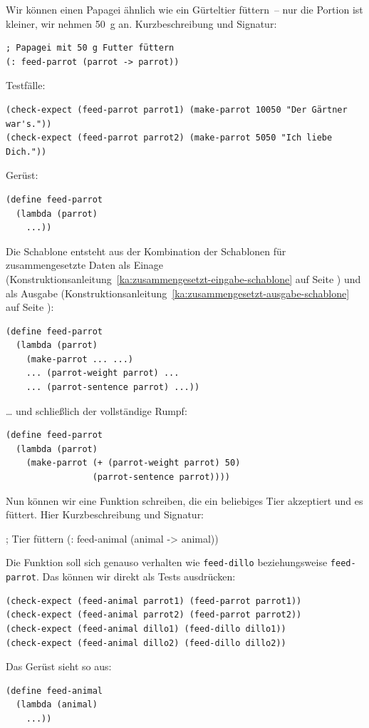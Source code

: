 Wir können einen Papagei ähnlich wie ein Gürteltier füttern~-- nur die
Portion ist kleiner, wir nehmen 50~g an.  Kurzbeschreibung und Signatur:
%
\begin{lstlisting}
; Papagei mit 50 g Futter füttern
(: feed-parrot (parrot -> parrot))
\end{lstlisting}
%
Testfälle:
%
\begin{lstlisting}
(check-expect (feed-parrot parrot1) (make-parrot 10050 "Der Gärtner war's."))
(check-expect (feed-parrot parrot2) (make-parrot 5050 "Ich liebe Dich."))
\end{lstlisting}
%
Gerüst:
%
\begin{lstlisting}
(define feed-parrot
  (lambda (parrot)
    ...))
\end{lstlisting}
%
Die Schablone entsteht aus der Kombination der Schablonen für
zusammengesetzte Daten
als Einage (Konstruktionsanleitung~\ref{ka:zusammengesetzt-eingabe-schablone} auf
Seite \pageref{ka:zusammengesetzt-eingabe-schablone}) und als Ausgabe
(Konstruktionsanleitung~\ref{ka:zusammengesetzt-ausgabe-schablone} auf
Seite \pageref{ka:zusammengesetzt-ausgabe-schablone}):
%
\begin{lstlisting}
(define feed-parrot
  (lambda (parrot)
    (make-parrot ... ...)
    ... (parrot-weight parrot) ...
    ... (parrot-sentence parrot) ...))
\end{lstlisting}
%
\ldots{} und schließlich der vollständige Rumpf:
%
\begin{lstlisting}
(define feed-parrot
  (lambda (parrot)
    (make-parrot (+ (parrot-weight parrot) 50)
                 (parrot-sentence parrot))))
\end{lstlisting}
%
Nun können wir eine Funktion schreiben, die ein beliebiges Tier
akzeptiert und es füttert.  Hier Kurzbeschreibung und Signatur:
%
\begin{aufgabe}
; Tier füttern
(: feed-animal (animal -> animal))
\end{aufgabe}
%
Die Funktion soll sich genauso verhalten wie \lstinline{feed-dillo}
beziehungsweise \lstinline{feed-parrot}.  Das können wir direkt als
Tests ausdrücken:
%
\begin{lstlisting}
(check-expect (feed-animal parrot1) (feed-parrot parrot1))
(check-expect (feed-animal parrot2) (feed-parrot parrot2))
(check-expect (feed-animal dillo1) (feed-dillo dillo1))
(check-expect (feed-animal dillo2) (feed-dillo dillo2))
\end{lstlisting}
%
Das Gerüst sieht so aus:
%
\begin{lstlisting}
(define feed-animal
  (lambda (animal)
    ...))
\end{lstlisting}
